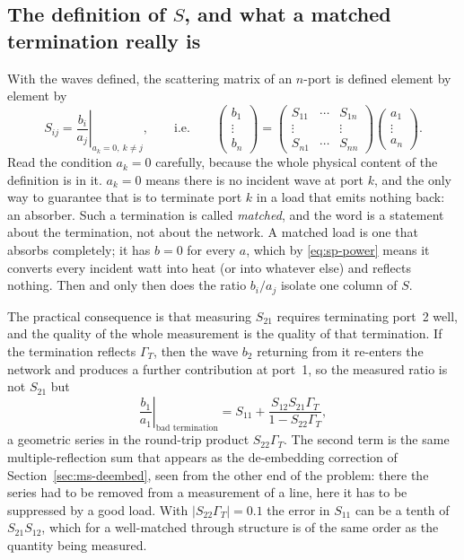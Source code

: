 \subsection{The definition of $S$, and what a matched termination really is}
\label{sec:sp-definition}

With the waves defined, the scattering matrix of an $n$-port is defined element by element by
\begin{equation}
  S_{ij} = \left.\frac{b_i}{a_j}\right|_{a_k = 0,\ k\neq j} ,
  \qquad\text{i.e.}\qquad
  \begin{pmatrix} b_1 \\ \vdots \\ b_n \end{pmatrix}
  =
  \begin{pmatrix} S_{11} & \cdots & S_{1n} \\ \vdots & & \vdots \\ S_{n1} & \cdots & S_{nn} \end{pmatrix}
  \begin{pmatrix} a_1 \\ \vdots \\ a_n \end{pmatrix}.
  \label{eq:sp-def}
\end{equation}
Read the condition $a_k=0$ carefully, because the whole physical content of the definition is in it. $a_k=0$
means there is no incident wave at port $k$, and the only way to guarantee that is to terminate port $k$ in a
load that emits nothing back: an absorber. Such a termination is called \emph{matched}, and the word is a
statement about the termination, not about the network. A matched load is one that absorbs completely; it has
$b=0$ for every $a$, which by \eqref{eq:sp-power} means it converts every incident watt into heat (or into
whatever else) and reflects nothing. Then and only then does the ratio $b_i/a_j$ isolate one column of $S$.

The practical consequence is that measuring $S_{21}$ requires terminating port~2 well, and the quality of the
whole measurement is the quality of that termination. If the termination reflects $\Gamma_T$, then the wave
$b_2$ returning from it re-enters the network and produces a further contribution at port~1, so the measured
ratio is not $S_{21}$ but
\begin{equation}
  \left.\frac{b_1}{a_1}\right|_{\text{bad termination}}
  = S_{11} + \frac{S_{12}S_{21}\Gamma_T}{1 - S_{22}\Gamma_T} ,
  \label{eq:sp-termination-error}
\end{equation}
a geometric series in the round-trip product $S_{22}\Gamma_T$. The second term is the same multiple-reflection
sum that appears as the de-embedding correction of Section~\ref{sec:ms-deembed}, seen from the other end of the
problem: there the series had to be removed from a measurement of a line, here it has to be suppressed by a good
load. With $|S_{22}\Gamma_T|=0.1$ the error in $S_{11}$ can be a tenth of $S_{21}S_{12}$, which for a
well-matched through structure is of the same order as the quantity being measured.


